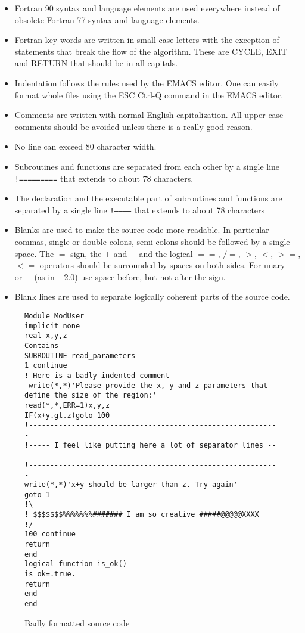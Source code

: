 \documentclass{article}
\begin{document}
\begin{itemize}
\item Fortran 90 syntax and language elements are used everywhere instead 
      of obsolete Fortran 77 syntax and language elements.
\item Fortran key words are written in small case letters with the 
      exception of statements that break the flow of the algorithm.
      These are CYCLE, EXIT and RETURN that should be in all capitals.
\item Indentation follows the rules used by the EMACS editor. One can
      easily format whole files using the ESC Ctrl-Q command in the
      EMACS editor.
\item Comments are written with normal English capitalization. All upper
      case comments should be avoided unless there is a really good reason.
\item No line can exceed 80 character width. 
\item Subroutines and functions are separated from each other 
      by a single line {\tt !=========} that extends to about 78 characters.
\item The declaration and the executable part of subroutines and functions
      are separated by a single line {\tt !------------} that extends to 
      about 78 characters
\item Blanks are used to make the source code more readable. In particular
      commas, single or double colons, semi-colons should be followed
      by a single space. The $=$ sign, the $+$ and $-$ and the logical 
      $==$, $/=$, $>$, $<$, $>=$, $<=$ operators should be surrounded
      by spaces on both sides. For unary $+$ or $-$ (as in $-2.0$) use 
      space before, but not after the sign.
\item Blank lines are used to separate logically coherent parts of the 
      source code.
\end{itemize}
      
\begin{figure}
\begin{verbatim}
Module ModUser
implicit none
real x,y,z
Contains
SUBROUTINE read_parameters 
1 continue
! Here is a badly indented comment
 write(*,*)'Please provide the x, y and z parameters that define the size of the region:'
read(*,*,ERR=1)x,y,z
IF(x+y.gt.z)goto 100
!-----------------------------------------------------------
!----- I feel like putting here a lot of separator lines ---
!-----------------------------------------------------------
write(*,*)'x+y should be larger than z. Try again'
goto 1
!\
! $$$$$$$%%%%%%%####### I am so creative #####@@@@@XXXX
!/
100 continue
return
end
logical function is_ok()
is_ok=.true.
return
end
end
\end{verbatim}
\caption{Badly formatted source code}
\label{fig:badformat}
\end{figure}
\end{document}
